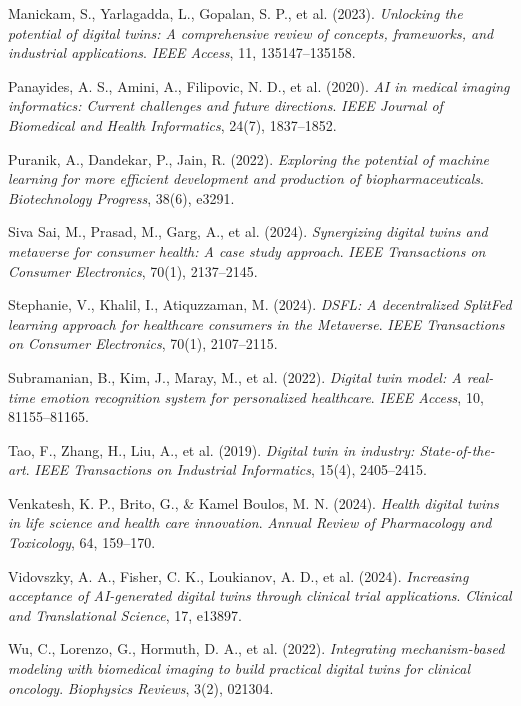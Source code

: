 \documentclass[10pt,a4paper]{article}
\begin{document}
\begin{thebibliography}{99}
Manickam, S., Yarlagadda, L., Gopalan, S. P., et al. (2023).  
\textit{Unlocking the potential of digital twins: A comprehensive review of concepts, frameworks, and industrial applications}.  
\textit{IEEE Access}, 11, 135147--135158.

Panayides, A. S., Amini, A., Filipovic, N. D., et al. (2020).  
\textit{AI in medical imaging informatics: Current challenges and future directions}.  
\textit{IEEE Journal of Biomedical and Health Informatics}, 24(7), 1837--1852.

Puranik, A., Dandekar, P., Jain, R. (2022).  
\textit{Exploring the potential of machine learning for more efficient development and production of biopharmaceuticals}.  
\textit{Biotechnology Progress}, 38(6), e3291.

Siva Sai, M., Prasad, M., Garg, A., et al. (2024).  
\textit{Synergizing digital twins and metaverse for consumer health: A case study approach}.  
\textit{IEEE Transactions on Consumer Electronics}, 70(1), 2137--2145.

Stephanie, V., Khalil, I., Atiquzzaman, M. (2024).  
\textit{DSFL: A decentralized SplitFed learning approach for healthcare consumers in the Metaverse}.  
\textit{IEEE Transactions on Consumer Electronics}, 70(1), 2107--2115.

Subramanian, B., Kim, J., Maray, M., et al. (2022).  
\textit{Digital twin model: A real-time emotion recognition system for personalized healthcare}.  
\textit{IEEE Access}, 10, 81155--81165.

Tao, F., Zhang, H., Liu, A., et al. (2019).  
\textit{Digital twin in industry: State-of-the-art}.  
\textit{IEEE Transactions on Industrial Informatics}, 15(4), 2405--2415.

Venkatesh, K. P., Brito, G., \& Kamel Boulos, M. N. (2024).  
\textit{Health digital twins in life science and health care innovation}.  
\textit{Annual Review of Pharmacology and Toxicology}, 64, 159--170.

Vidovszky, A. A., Fisher, C. K., Loukianov, A. D., et al. (2024).  
\textit{Increasing acceptance of AI-generated digital twins through clinical trial applications}.  
\textit{Clinical and Translational Science}, 17, e13897.

Wu, C., Lorenzo, G., Hormuth, D. A., et al. (2022).  
\textit{Integrating mechanism-based modeling with biomedical imaging to build practical digital twins for clinical oncology}.  
\textit{Biophysics Reviews}, 3(2), 021304.

\end{thebibliography}
\end{document}
